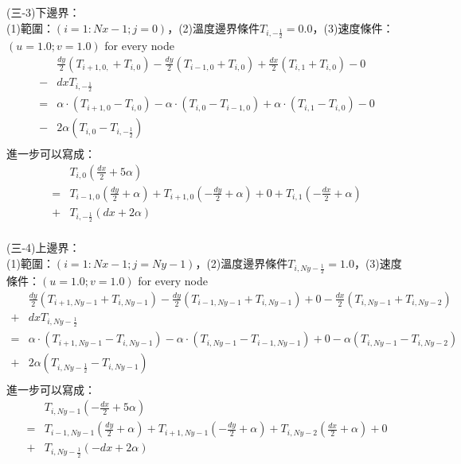 \documentclass[12pt]{article}
\begin{document}
\noindent (三-3)下邊界：\\

(1)範圍：$(i = 1 : Nx-1 ; j = 0)$，(2)溫度邊界條件$T_{i,-\frac{1}{2}} = 0.0$，(3)速度條件：$(u = 1.0 ; v = 1.0)$ for every node\\
\begin{equation}
  \begin{split}
    &\frac{dy}{2}(T_{i+1,0,}+T_{i,0})-\frac{dy}{2}(T_{i-1,0}+T_{i,0}) + \frac{dx}{2}(T_{i,1}+T_{i,0}) - 0 \\-& dx T_{i,-\frac{1}{2}} \\
    = &\alpha \cdot (T_{i+1,0}-T_{i,0})-\alpha \cdot (T_{i,0}-T_{i-1,0}) + \alpha \cdot (T_{i,1} - T_{i,0}) -0 \\-& 2\alpha(T_{i,0}-T_{i,-\frac{1}{2}}) \\ 
  \end{split}
\end{equation}
\noindent 進一步可以寫成：\\
\begin{equation}
  \begin{split}
    &T_{i,0}(\frac{dx}{2}+5\alpha )\\
    =&T_{i-1,0}(\frac{dy}{2}+\alpha) +T_{i+1,0}(-\frac{dy}{2}+\alpha) +0 +T_{i,1}(-\frac{dx}{2}+\alpha)\\
    +&T_{i,-\frac{1}{2}}(dx+2\alpha) \\
  \end{split}
\end{equation}

\noindent (三-4)上邊界：\\

(1)範圍：$(i = 1 : Nx-1 ; j = Ny-1)$，(2)溫度邊界條件$T_{i,Ny-\frac{1}{2}} = 1.0$，(3)速度條件：$(u = 1.0 ; v = 1.0)$ for every node\\
\begin{equation}
  \begin{split}
    &\frac{dy}{2}(T_{i+1,Ny-1}+T_{i,Ny-1})-\frac{dy}{2}(T_{i-1,Ny-1}+T_{i,Ny-1}) + 0 - \frac{dx}{2}(T_{i,Ny-1} + T_{i,Ny-2}) \\+& dx T_{i,Ny-\frac{1}{2}} \\
    = &\alpha \cdot (T_{i+1,Ny-1}-T_{i,Ny-1})-\alpha \cdot (T_{i,Ny-1}-T_{i-1,Ny-1})+ 0 - \alpha (T_{i,Ny-1}-T_{i,Ny-2}) \\+& 2\alpha(T_{i,Ny-\frac{1}{2}} - T_{i,Ny-1}) \\ 
  \end{split}
\end{equation}
\noindent 進一步可以寫成：\\
\begin{equation}
  \begin{split}
    &T_{i,Ny-1}(-\frac{dx}{2}+5\alpha )\\
    =&T_{i-1,Ny-1}(\frac{dy}{2}+\alpha) +T_{i+1,Ny-1}(-\frac{dy}{2}+\alpha) + T_{i,Ny-2}(\frac{dx}{2}+\alpha) + 0 \\
    +&T_{i,Ny-\frac{1}{2}}(-dx+2\alpha) \\
  \end{split}
\end{equation}
\vspace{0.6em}
\end{document}
